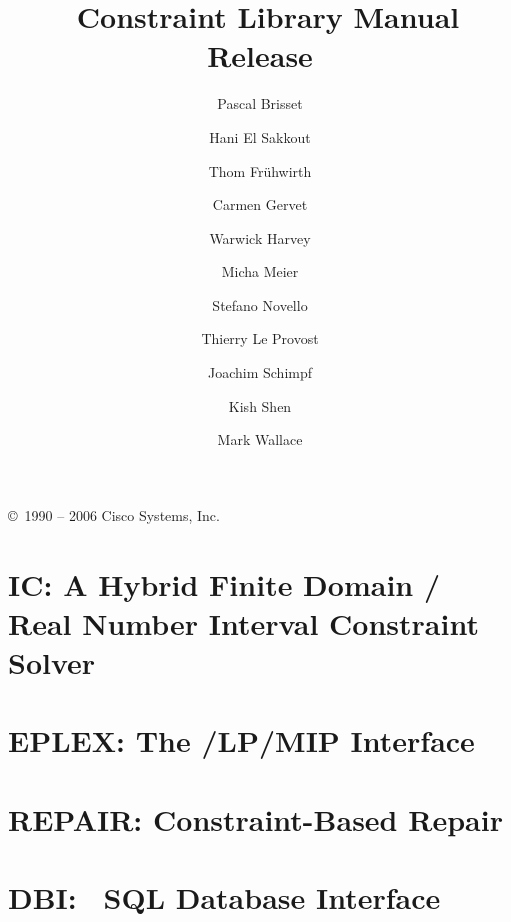 \documentclass[11pt,a4paper]{book}
\title{{\Huge \eclipse\ Constraint Library Manual}\\
	\vspace{1cm}
	Release \eclipseversion
    }
\author{
Pascal Brisset
\and Hani El Sakkout
\and Thom Fr\"{u}hwirth
\and Carmen Gervet
\and Warwick Harvey
\and Micha Meier
\and Stefano Novello
\and Thierry Le Provost
\and Joachim Schimpf
\and Kish Shen
\and Mark Wallace}
\begin{document}
\maketitle

\setcounter{page}{2}
\pagestyle{empty}

\vfill

\copyright\ 1990 -- 2006 Cisco Systems, Inc. 

\bigskip\bigskip\bigskip\bigskip\bigskip\bigskip

\cleardoublepage
\pagestyle{plain}

\tableofcontents

\cleardoublepage
{}





\chapter{IC: A Hybrid Finite Domain / Real Number Interval Constraint Solver}
\label{chapic}












\chapter{EPLEX: The \eclipse/LP/MIP Interface}
\label{chapeplex}


\chapter{REPAIR: Constraint-Based Repair}
\label{chaprepair}


\chapter{DBI: \eclipse\ SQL Database Interface}
\label{chapdbi}



\newpage
\printindex
\newpage


\end{document}
